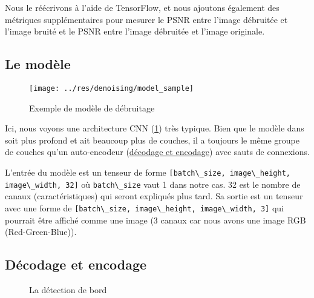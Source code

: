 \documentclass[
  11pt,
  dvipsnames]{article}
\newcommand{\passthrough}[1]{#1}
\begin{document}
Nous le réécrivons à l'aide de TensorFlow, et nous ajoutons également des métriques supplémentaires pour mesurer le PSNR entre l'image débruitée et l'image bruité et le PSNR entre l'image débruitée et l'image originale.

\hypertarget{le-moduxe8le}{%
\subsection{Le modèle}\label{le-moduxe8le}}

\begin{figure}

{\centering \texttt{[image: ../res/denoising/model\_sample]} 

}

\caption{Exemple de modèle de débruitage}\label{fig:denoising-model}
\end{figure}

Ici, nous voyons une architecture CNN (\ref{fig:denoising-model}) très typique. Bien que le modèle dans \autocite{1711.10925} soit plus profond et ait beaucoup plus de couches, il a toujours le même groupe de couches qu'un auto-encodeur (\protect\hyperlink{duxe9codage-et-encodage}{décodage et encodage}) avec sauts de connexions.

L'entrée du modèle est un tenseur de forme \passthrough{\lstinline![batch\_size, image\_height, image\_width, 32]!} où \passthrough{\lstinline!batch\_size!} vaut 1 dans notre cas. 32 est le nombre de canaux (caractéristiques) qui seront expliqués plus tard. Sa sortie est un tenseur avec une forme de \passthrough{\lstinline![batch\_size, image\_height, image\_width, 3]!} qui pourrait être affiché comme une image (3 canaux car nous avons une image RGB (Red-Green-Blue)).

\hypertarget{duxe9codage-et-encodage}{%
\subsection{Décodage et encodage}\label{duxe9codage-et-encodage}}

\begin{figure}

{\centering {}

}

\caption{La détection de bord}\label{fig:compare-with-edge}
\end{figure}
\end{document}
